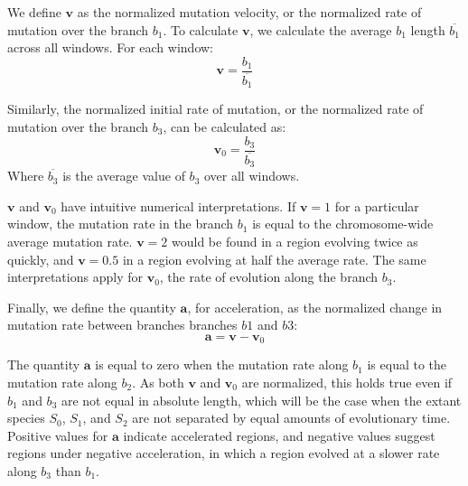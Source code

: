 \documentclass{article} %
\begin{document}
We define $\textbf{v}$ as the normalized mutation velocity, or the normalized rate of mutation over the branch $b_1$. To calculate $\textbf{v}$, we calculate the average $b_1$ length $\overline{b_1}$ across all windows. For each window:
\begin{equation*}
	\textbf{v} = \frac{b_1}{\overline{b_1}}
\end{equation*}

Similarly, the normalized initial rate of mutation, or the normalized rate of mutation over the branch $b_3$, can be calculated as:
\begin{equation*}
	\textbf{v}_0 = \frac{b_3}{\overline{b_3}}
\end{equation*}
Where $\overline{b_3}$ is the average value of $b_3$ over all windows.\par
$\textbf{v}$ and $\textbf{v}_0$ have intuitive numerical interpretations. If $\textbf{v} = 1$ for a particular window, the mutation rate in the branch $b_1$ is equal to the chromosome-wide average mutation rate. $\textbf{v} = 2$ would be found in a region evolving twice as quickly, and $\textbf{v} = 0.5$ in a region evolving at half the average rate. The same interpretations apply for $\textbf{v}_0$, the rate of evolution along the branch $b_3$.\par
Finally, we define the quantity $\textbf{a}$, for acceleration, as the normalized change in mutation rate between branches branches $b1$ and $b3$:
\begin{equation*}
\textbf{a} = \textbf{v} - \textbf{v}_0
\end{equation*}

The quantity $\textbf{a}$ is equal to zero when the mutation rate along $b_1$ is equal to the mutation rate along $b_2$. As both $\textbf{v}$ and $\textbf{v}_0$ are normalized, this holds true even if $b_1$ and $b_3$ are not equal in absolute length, which will be the case when the extant species $S_0$, $S_1$, and $S_2$ are not separated by equal amounts of evolutionary time. Positive values for $\textbf{a}$ indicate accelerated regions, and negative values suggest regions under negative acceleration, in which a region evolved at a slower rate along $b_3$ than $b_1$.
 
\end{document}
